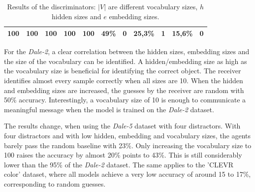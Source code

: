 \begin{table}[ht]
\begin{tabular}{ccccc|cc|cc|cc}
        {100} & {100}   & {100}   & {100}   & {100}   & {49\%}                              & {0}                                 & {25,3\%}                                 & {1}             & {15,6\%}          & {0}             \\
        \bottomrule
    \end{tabular}
    \caption{Results of the discriminators: $|V|$ are different vocabulary sizes, $h$ hidden sizes and $e$ embedding sizes.}
    \label{tab:results_discriminator}
\end{table}

For the \emph{Dale-2}, a clear correlation between the hidden sizes, embedding sizes and the size of the vocabulary can be identified.
A hidden/embedding size as high as the vocabulary size is beneficial for identifying the correct object.
The receiver identifies almost every sample correctly when all sizes are 10.
When the hidden and embedding sizes are increased, the guesses by the receiver are random with 50\% accuracy.
Interestingly, a vocabulary size of 10 is enough to communicate a meaningful message when the model is trained on the \emph{Dale-2} dataset.

The results change, when using the \emph{Dale-5} dataset with four distractors.
With four distractors and with low hidden, embedding and vocabulary sizes, the agents barely pass the random baseline with 23\%.
Only increasing the vocabulary size to 100 raises the accuracy by almost 20\% points to 43\%.
This is still considerably lower than the 95\% of the \emph{Dale-2} dataset.
The same applies to the 'CLEVR color' dataset, where all models achieve a very low accuracy of around 15 to 17\%, corresponding to random guesses.


